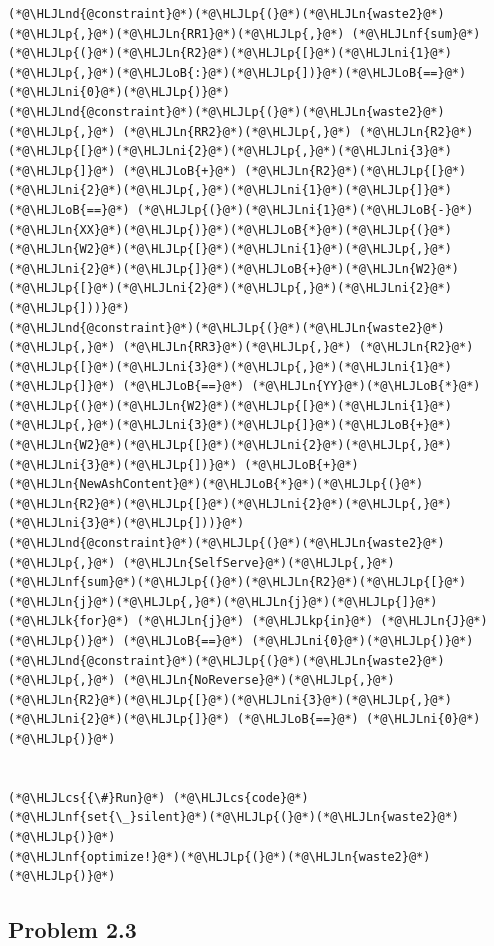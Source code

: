\documentclass[12pt,a4paper]{article}
\newcommand{\HLJLk}[1]{\textcolor[RGB]{148,91,176}{\textbf{#1}}}
\newcommand{\HLJLkp}[1]{\textcolor[RGB]{148,91,176}{\textbf{#1}}}
\newcommand{\HLJLn}[1]{#1}
\newcommand{\HLJLnd}[1]{\textcolor[RGB]{214,102,97}{#1}}
\newcommand{\HLJLnf}[1]{\textcolor[RGB]{66,102,213}{#1}}
\newcommand{\HLJLni}[1]{\textcolor[RGB]{59,151,46}{#1}}
\newcommand{\HLJLoB}[1]{\textcolor[RGB]{102,102,102}{\textbf{#1}}}
\newcommand{\HLJLp}[1]{#1}
\newcommand{\HLJLcs}[1]{\textcolor[RGB]{153,153,119}{\textit{#1}}}
\begin{document}
\begin{lstlisting}
(*@\HLJLnd{@constraint}@*)(*@\HLJLp{(}@*)(*@\HLJLn{waste2}@*)(*@\HLJLp{,}@*)(*@\HLJLn{RR1}@*)(*@\HLJLp{,}@*) (*@\HLJLnf{sum}@*)(*@\HLJLp{(}@*)(*@\HLJLn{R2}@*)(*@\HLJLp{[}@*)(*@\HLJLni{1}@*)(*@\HLJLp{,}@*)(*@\HLJLoB{:}@*)(*@\HLJLp{])}@*)(*@\HLJLoB{==}@*) (*@\HLJLni{0}@*)(*@\HLJLp{)}@*)
(*@\HLJLnd{@constraint}@*)(*@\HLJLp{(}@*)(*@\HLJLn{waste2}@*)(*@\HLJLp{,}@*) (*@\HLJLn{RR2}@*)(*@\HLJLp{,}@*) (*@\HLJLn{R2}@*)(*@\HLJLp{[}@*)(*@\HLJLni{2}@*)(*@\HLJLp{,}@*)(*@\HLJLni{3}@*)(*@\HLJLp{]}@*) (*@\HLJLoB{+}@*) (*@\HLJLn{R2}@*)(*@\HLJLp{[}@*)(*@\HLJLni{2}@*)(*@\HLJLp{,}@*)(*@\HLJLni{1}@*)(*@\HLJLp{]}@*) (*@\HLJLoB{==}@*) (*@\HLJLp{(}@*)(*@\HLJLni{1}@*)(*@\HLJLoB{-}@*)(*@\HLJLn{XX}@*)(*@\HLJLp{)}@*)(*@\HLJLoB{*}@*)(*@\HLJLp{(}@*)(*@\HLJLn{W2}@*)(*@\HLJLp{[}@*)(*@\HLJLni{1}@*)(*@\HLJLp{,}@*)(*@\HLJLni{2}@*)(*@\HLJLp{]}@*)(*@\HLJLoB{+}@*)(*@\HLJLn{W2}@*)(*@\HLJLp{[}@*)(*@\HLJLni{2}@*)(*@\HLJLp{,}@*)(*@\HLJLni{2}@*)(*@\HLJLp{]))}@*)
(*@\HLJLnd{@constraint}@*)(*@\HLJLp{(}@*)(*@\HLJLn{waste2}@*)(*@\HLJLp{,}@*) (*@\HLJLn{RR3}@*)(*@\HLJLp{,}@*) (*@\HLJLn{R2}@*)(*@\HLJLp{[}@*)(*@\HLJLni{3}@*)(*@\HLJLp{,}@*)(*@\HLJLni{1}@*)(*@\HLJLp{]}@*) (*@\HLJLoB{==}@*) (*@\HLJLn{YY}@*)(*@\HLJLoB{*}@*)(*@\HLJLp{(}@*)(*@\HLJLn{W2}@*)(*@\HLJLp{[}@*)(*@\HLJLni{1}@*)(*@\HLJLp{,}@*)(*@\HLJLni{3}@*)(*@\HLJLp{]}@*)(*@\HLJLoB{+}@*)(*@\HLJLn{W2}@*)(*@\HLJLp{[}@*)(*@\HLJLni{2}@*)(*@\HLJLp{,}@*)(*@\HLJLni{3}@*)(*@\HLJLp{])}@*) (*@\HLJLoB{+}@*) (*@\HLJLn{NewAshContent}@*)(*@\HLJLoB{*}@*)(*@\HLJLp{(}@*)(*@\HLJLn{R2}@*)(*@\HLJLp{[}@*)(*@\HLJLni{2}@*)(*@\HLJLp{,}@*)(*@\HLJLni{3}@*)(*@\HLJLp{]))}@*)
(*@\HLJLnd{@constraint}@*)(*@\HLJLp{(}@*)(*@\HLJLn{waste2}@*)(*@\HLJLp{,}@*) (*@\HLJLn{SelfServe}@*)(*@\HLJLp{,}@*) (*@\HLJLnf{sum}@*)(*@\HLJLp{(}@*)(*@\HLJLn{R2}@*)(*@\HLJLp{[}@*)(*@\HLJLn{j}@*)(*@\HLJLp{,}@*)(*@\HLJLn{j}@*)(*@\HLJLp{]}@*) (*@\HLJLk{for}@*) (*@\HLJLn{j}@*) (*@\HLJLkp{in}@*) (*@\HLJLn{J}@*)(*@\HLJLp{)}@*) (*@\HLJLoB{==}@*) (*@\HLJLni{0}@*)(*@\HLJLp{)}@*)
(*@\HLJLnd{@constraint}@*)(*@\HLJLp{(}@*)(*@\HLJLn{waste2}@*)(*@\HLJLp{,}@*) (*@\HLJLn{NoReverse}@*)(*@\HLJLp{,}@*) (*@\HLJLn{R2}@*)(*@\HLJLp{[}@*)(*@\HLJLni{3}@*)(*@\HLJLp{,}@*)(*@\HLJLni{2}@*)(*@\HLJLp{]}@*) (*@\HLJLoB{==}@*) (*@\HLJLni{0}@*)(*@\HLJLp{)}@*)


(*@\HLJLcs{{\#}Run}@*) (*@\HLJLcs{code}@*)
(*@\HLJLnf{set{\_}silent}@*)(*@\HLJLp{(}@*)(*@\HLJLn{waste2}@*)(*@\HLJLp{)}@*)
(*@\HLJLnf{optimize!}@*)(*@\HLJLp{(}@*)(*@\HLJLn{waste2}@*)(*@\HLJLp{)}@*)
\end{lstlisting}


\subsection{Problem 2.3}
\end{document}
